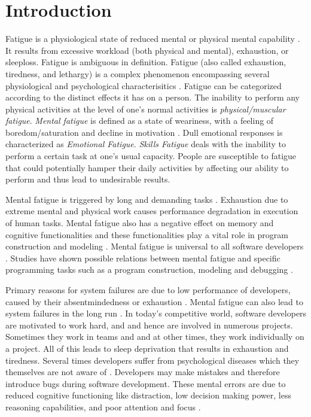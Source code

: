\documentclass{acm_proc_article-sp}
\begin{document}

\section{Introduction}
Fatigue is a physiological state of reduced mental or physical mental
capability \cite{psychology:paul}. It
results from excessive workload (both physical and mental), exhaustion,
or sleeploss. Fatigue is ambiguous in definition. Fatigue (also called
exhaustion, tiredness, and lethargy) \cite{website:wiki-fatigue} is a complex
phenomenon encompassing several physiological and psychological characterisitics
\cite{psychology:paul}. Fatigue can be categorized according to the distinct
effects it has on a person. The inability to perform any physical activities at
the level of one's normal activities is \textit{physical/muscular fatigue}.
\textit{Mental fatigue} is defined as a state of weariness, with a feeling of
boredom/saturation and decline in motivation \cite{lauren:defining}. Dull
emotional responses is characterized as \textit{Emotional Fatigue}.
\textit{Skills Fatigue} deals with the inability to perform a certain task at
one's usual capacity. People are susceptible to fatigue that could
potentially hamper their daily activities by affecting our ability to perform
and thus lead to undesirable results.

Mental fatigue is triggered by long and demanding tasks \cite{lauren:defining}.
Exhaustion due to extreme mental and physical work causes performance
degradation in execution of human tasks. Mental fatigue also has a negative
effect on memory and cognitive functionalities and these functionalities play a
vital role in program construction and modeling \cite{schneiderman:interaction}.
Mental fatigue is universal to all software developers
\cite{website:blog-fatigue}. Studies have shown possible relations between
mental fatigue and specific programming tasks such as a program construction,
modeling and debugging \cite{schneiderman:interaction}.

Primary reasons for system failures are due to low performance of developers,
caused by their absentmindedness or exhaustion \cite{rocco:gartner}. Mental
fatigue can also lead to system failures in the long run \cite{rocco:gartner}.
In today's competitive world, software developers are motivated to work hard,
and and hence are involved in numerous projects. Sometimes they work in teams
and and at other times, they work individually on a project. All of this leads
to sleep deprivation that results in exhaustion and tiredness. Several times
developers suffer from psychological diseases which they themselves are not
aware of \cite{website:blog-fatigue}. Developers may make mistakes and therefore
introduce bugs during software development. These mental errors are due to
reduced cognitive functioning like distraction, low decision making power, less
reasoning capabilities, and poor attention and focus \cite{larson:cogFailures}.
\end{document}
